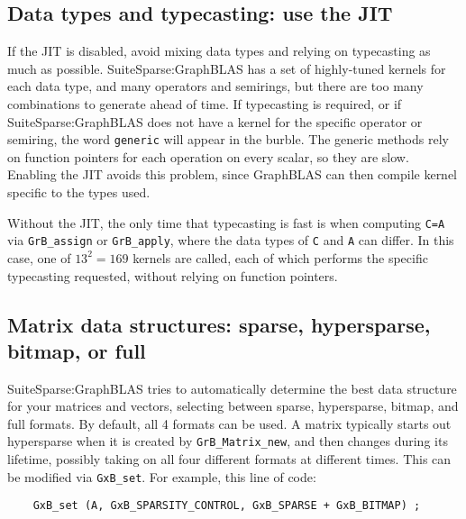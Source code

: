 \documentclass[12pt]{article}
\begin{document}
\subsection{Data types and typecasting: use the JIT}

If the JIT is disabled,
avoid mixing data types and relying on typecasting as much as possible.
SuiteSparse:GraphBLAS has a set of highly-tuned kernels for each data type,
and many operators and semirings, but there are too many combinations to
generate ahead of time.  If typecasting is required, or if
SuiteSparse:GraphBLAS does not have a kernel for the specific operator or
semiring, the word \verb'generic' will appear in the burble.  The generic
methods rely on function pointers for each operation on every scalar, so they
are slow.  Enabling the JIT avoids this problem, since GraphBLAS can then
compile kernel specific to the types used.

Without the JIT,
the only time that typecasting is fast is when computing \verb'C=A' via
\verb'GrB_assign' or \verb'GrB_apply', where the data types of \verb'C' and
\verb'A' can differ.  In this case, one of $13^2 = 169$ kernels are called,
each of which performs the specific typecasting requested, without relying on
function pointers.

\subsection{Matrix data structures: sparse, hypersparse, bitmap, or full}

SuiteSparse:GraphBLAS tries to automatically determine the best data structure
for your matrices and vectors, selecting between sparse, hypersparse, bitmap,
and full formats.  By default, all 4 formats can be used.  A matrix typically
starts out hypersparse when it is created by \verb'GrB_Matrix_new', and then
changes during its lifetime, possibly taking on all four different formats
at different times.  This can be modified via \verb'GxB_set'.  For example,
this line of code:

    {\footnotesize
    \begin{verbatim}
    GxB_set (A, GxB_SPARSITY_CONTROL, GxB_SPARSE + GxB_BITMAP) ; \end{verbatim}}
\end{document}
